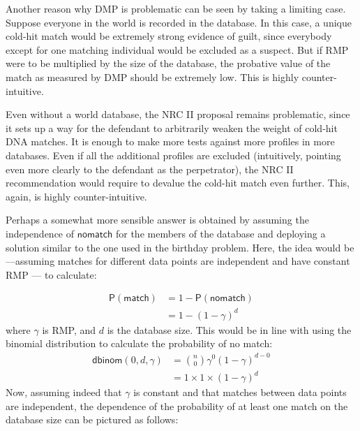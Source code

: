 \documentclass[10pt,dvipsnames,enabledeprecatedfontcommands]{scrartcl}
\newcommand{\pr}[1]{\mathsf{P}(#1)}
\begin{document}
Another reason why DMP is problematic can be seen by taking a limiting
case. Suppose everyone in the world is recorded in the database. In this
case, a unique cold-hit match would be extremely strong evidence of
guilt, since everybody except for one matching individual would be
excluded as a suspect. But if RMP were to be multiplied by the size of
the database, the probative value of the match as measured by DMP should
be extremely low. This is highly counter-intuitive.

Even without a world database, the NRC II proposal remains problematic,
since it sets up a way for the defendant to arbitrarily weaken the
weight of cold-hit DNA matches. It is enough to make more tests against
more profiles in more databases. Even if all the additional profiles are
excluded (intuitively, pointing even more clearly to the defendant as
the perpetrator), the NRC II recommendation would require to devalue the
cold-hit match even further. This, again, is highly counter-intuitive.

Perhaps a somewhat more sensible answer is obtained by assuming the
independence of \(\mathsf{no match}\) for the members of the database
and deploying a solution similar to the one used in the birthday
problem. Here, the idea would be---assuming matches for different data
points are independent and have constant RMP --- to calculate:

\begin{align*}
\pr{\mathsf{match}} & = 1 - \pr{\mathsf{no match}}\\
& = 1 - (1-\gamma)^d
\end{align*} \noindent where \(\gamma\) is RMP, and \(d\) is the
database size. This would be in line with using the binomial
distribution to calculate the probability of no match: \begin{align*}
\mathsf{dbinom}(0,d,\gamma) & = {n \choose 0} \gamma^0 (1-\gamma)^{d-0}\\
& = 1 \times 1 \times (1-\gamma)^d
\end{align*} Now, assuming indeed that \(\gamma\) is constant and that
matches between data points are independent, the dependence of the
probability of at least one match on the database size can be pictured
as follows:
\end{document}
